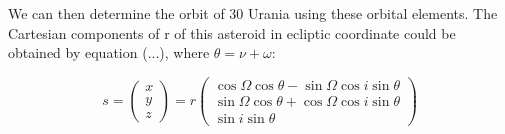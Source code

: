 \documentclass[letterpaper,12pt]{article}
\begin{document}
We can then determine the orbit of 30 Urania using these orbital elements. The Cartesian components of r of this asteroid in ecliptic coordinate could be obtained by equation (...), where \begin{math} \theta = \nu + \omega \end{math}:

\begin{equation}
s=
\begin{pmatrix}
  x \\
  y \\
  z
 \end{pmatrix} 
  =r
\begin{pmatrix}
\cos \Omega \cos \theta - \sin \Omega \cos i \sin \theta \\ 
 \sin \Omega \cos \theta+ \cos \Omega \cos i \sin \theta \\ 
 \sin i \sin \theta
\end{pmatrix}
\end{equation}
\end{document}
